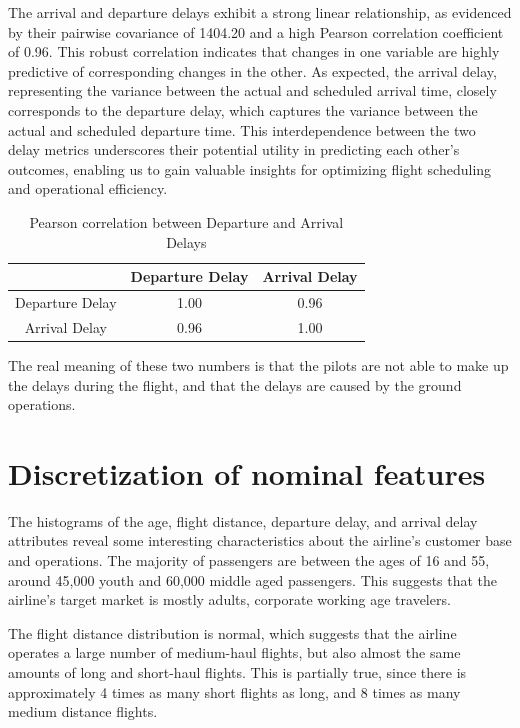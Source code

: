 \documentclass[11pt]{article}
\begin{document}
The arrival and departure delays exhibit a strong linear relationship, as evidenced by their pairwise covariance of 1404.20 and a high Pearson correlation coefficient of 0.96. This robust correlation indicates that changes in one variable are highly predictive of corresponding changes in the other. As expected, the arrival delay, representing the variance between the actual and scheduled arrival time, closely corresponds to the departure delay, which captures the variance between the actual and scheduled departure time. This interdependence between the two delay metrics underscores their potential utility in predicting each other's outcomes, enabling us to gain valuable insights for optimizing flight scheduling and operational efficiency.

\begin{table}[!h]
    \centering
    \begin{tabular}{|c|c|c|}
        \hline 
        &  Departure Delay & Arrival Delay \\
        \hline
        Departure Delay   &   1.00  &  0.96 \\
        \hline
        Arrival Delay     &   0.96  &  1.00 \\
        \hline
    \end{tabular}
    \caption{Pearson correlation between Departure and Arrival Delays}
    \label{tab:corr}
\end{table}
    
The real meaning of these two numbers is that the pilots are not able to make up the delays during the flight, and that the delays are caused by the ground operations.


    
\hypertarget{discretization-of-nominal-features}{%
\section{Discretization of nominal
features}\label{discretization-of-nominal-features}}


The histograms of the age, flight distance, departure delay, and arrival delay attributes reveal some interesting characteristics about the airline's customer base and operations. The majority of passengers are between the ages of 16 and 55, around 45,000 youth and 60,000 middle aged passengers. This suggests that the airline's target market is mostly adults, corporate working age travelers. 

The flight distance distribution is normal, which suggests that the airline operates a large number of medium-haul flights, but also almost the same amounts of long and short-haul flights. This is partially true, since there is approximately 4 times as many short flights as long, and 8 times as many medium distance flights.
\end{document}
